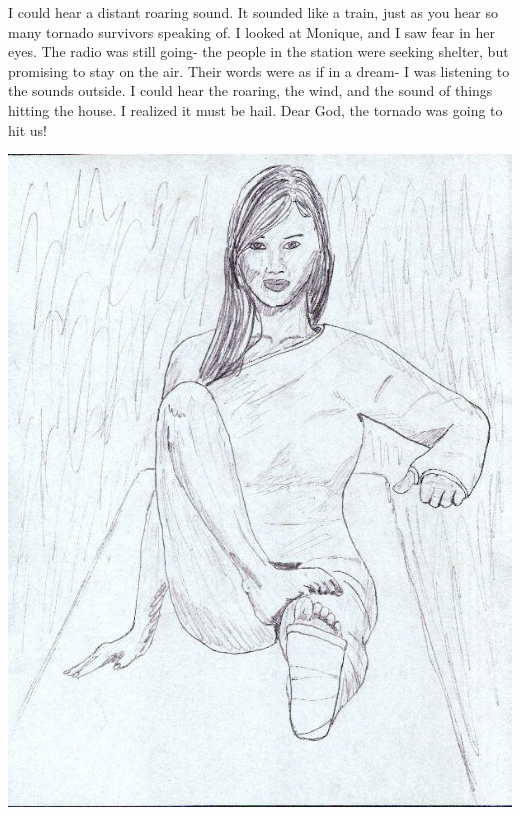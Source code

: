 I could hear a distant roaring sound. It sounded like a train, just as you hear so many
tornado survivors speaking of. I looked at Monique, and I saw fear in her eyes. The radio was
still going- the people in the station were seeking shelter, but promising to stay on the air.
Their words were as if in a dream- I was listening to the sounds outside. I could hear the
roaring, the wind, and the sound of things hitting the house. I realized it must be hail. Dear
God, the tornado was going to hit us!

\newpage
\begin{center}
\includegraphics{images/kicks26.jpg}
\end{center}

